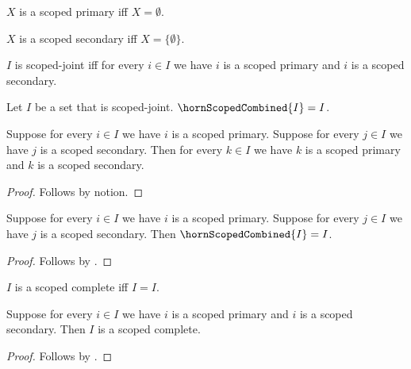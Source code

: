 \begin{definition}\label{horn_scoped_primary}
    $X$ is a scoped primary iff $X=\emptyset$.
\end{definition}

\begin{definition}\label{horn_scoped_secondary}
    $X$ is a scoped secondary iff $X=\{\emptyset\}$.
\end{definition}

\begin{abbreviation}\label{horn_scoped_joint}
    $I$ is scoped-joint iff for every $i\in I$ we have $i$ is a scoped primary and $i$ is a scoped secondary.
\end{abbreviation}

\begin{definition}\label{horn_scoped_combined}
    Let $I$ be a set that is scoped-joint.
    $\hornScopedCombined{I}=I$.
\end{definition}

\begin{proposition}\label{horn_scoped_conjunction_goal}
    Suppose for every $i\in I$ we have $i$ is a scoped primary.
    Suppose for every $j\in I$ we have $j$ is a scoped secondary.
    Then for every $k\in I$ we have $k$ is a scoped primary and $k$ is a scoped secondary.
\end{proposition}
\begin{proof}
    Follows by notion.
\end{proof}

\begin{proposition}\label{horn_scoped_contract}
    Suppose for every $i\in I$ we have $i$ is a scoped primary.
    Suppose for every $j\in I$ we have $j$ is a scoped secondary.
    Then $\hornScopedCombined{I}=I$.
\end{proposition}
\begin{proof}
    Follows by .
\end{proof}

\begin{definition}\label{horn_scoped_complete}
    $I$ is a scoped complete iff $I=I$.
\end{definition}

\begin{classification}\label{horn_scoped_whole_premise}
    Suppose for every $i\in I$ we have $i$ is a scoped primary and $i$ is a scoped secondary.
    Then $I$ is a scoped complete.
\end{classification}
\begin{proof}
    Follows by .
\end{proof}

